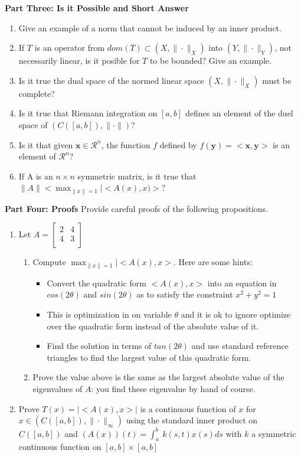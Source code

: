 \documentclass[11pt]{SelfArxOneColBMN}
\begin{document}
\textbf{Part Three: Is it Possible and Short Answer}
\begin{enumerate}
  \item Give an example of a norm that cannot be induced by an inner product.
  \item If $T$ is an operator from $dom(T) \subset (X,\|\cdot\|_X)$ into $(Y,\|\cdot\|_Y)$, not necessarily linear, is it posible for $T$ to be bounded? Give an example.
  \item Is it true the dual space of the normed linear space $(X,\|\cdot\|_X)$ must be complete?
  \item Is it true that Riemann integration on $[a,b]$ defines an element of the duel space of $(C([a,b]),\|\cdot\|)$?
  \item Is it that given $\mathbf{x} \in \mathcal{R}^n$, the function $f$ defined by $f(\mathbf{y}) = <\mathbf{x},\mathbf{y}>$ is an element of $\mathcal{R}^n$?
  \item If A is an $n \times n$ symmetric matrix, is it true that $\|A\| < \max_{\|x\| = 1}|<A(x),x)>$?
\end{enumerate}

\textbf{Part Four: Proofs}
Provide careful proofs of the following propositions.
\begin{enumerate}
  \item Let $A =
  \begin{bmatrix}
    2 & 4\\
    4 & 3\\
  \end{bmatrix}
  $
  \begin{enumerate}[label=\alph*)]
    \item Compute $\max_{\|x\|=1}|<A(x),x>$. Here are some hints:
    \begin{itemize}
      \item Convert the quadratic form $<A(x),x>$ into an equation in $cos(2\theta)$ and $sin(2\theta)$ as to satisfy the constraint $x^2 + y^2 = 1$
      \item This is optimization in on variable $\theta$ and it is ok to ignore optimize over the quadratic form instead of the absolute value of it.
      \item Find the solution in terms of $tan(2\theta)$ and use standard reference triangles to find the largest value of this quadratic form.
    \end{itemize}
    \item Prove the value above is the same as the largest absolute value of the eigenvalues of $A$: you find these eigenvalue by hand of course.
  \end{enumerate}
  \item Prove $T(x) = |<A(x),x>|$ is a continuous function of $x$ for $x \in (C([a,b]),\|\cdot\|_\infty)$ using the standard inner product on $C([a,b])$ and $(A(x))(t) = \int_a^b\:k(s,t)x(s)ds$ with $k$ a symmetric continuous function on $[a,b]\times[a,b]$
\end{enumerate}
\end{document}
